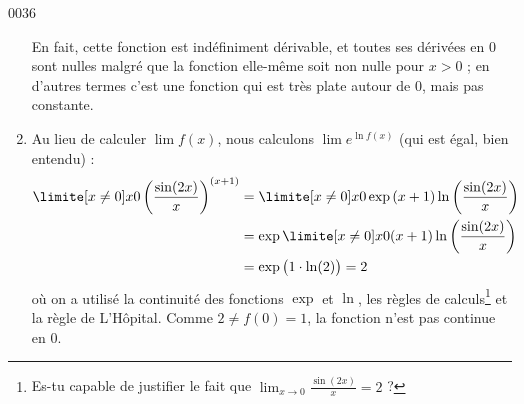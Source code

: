 \begin{corrige}{0036}
\begin{enumerate}
En fait, cette fonction est indéfiniment dérivable, et toutes ses dérivées en $0$ sont nulles malgré que la fonction elle-même soit non nulle pour $x > 0$ ; en d'autres termes c'est une fonction qui est très plate autour de $0$, mais pas constante.

\item
Au lieu de calculer $\lim f(x)$, nous calculons $\lim e^{\ln f(x) }$ (qui est égal, bien entendu) :
\begin{align*}
  \limite[x \neq 0] x 0 \left(\frac{\sin(2x)}{x}\right)^{(x+1)} &=
  \limite[x \neq 0] x 0 \exp{{(x+1)}
    \ln\left(\frac{\sin(2x)}{x}\right)}\\
  &= \exp{\limite[x \neq 0] x 0 {(x+1)}
    \ln\left(\frac{\sin(2x)}{x}\right)}\\
  &= \exp\big({1\cdot \ln(2)}\big) = 2
\end{align*}
où on a utilisé la continuité des fonctions $\exp{}$ et $\ln{}$, les règles de calculs\footnote{Es-tu capable de justifier le fait que $\lim_{x\to 0}\frac{ \sin(2x) }{ x }=2$ ?} et la règle de L'Hôpital. Comme $2 \neq f(0) = 1$, la fonction n'est pas continue en $0$.


\end{enumerate}

\end{corrige}
